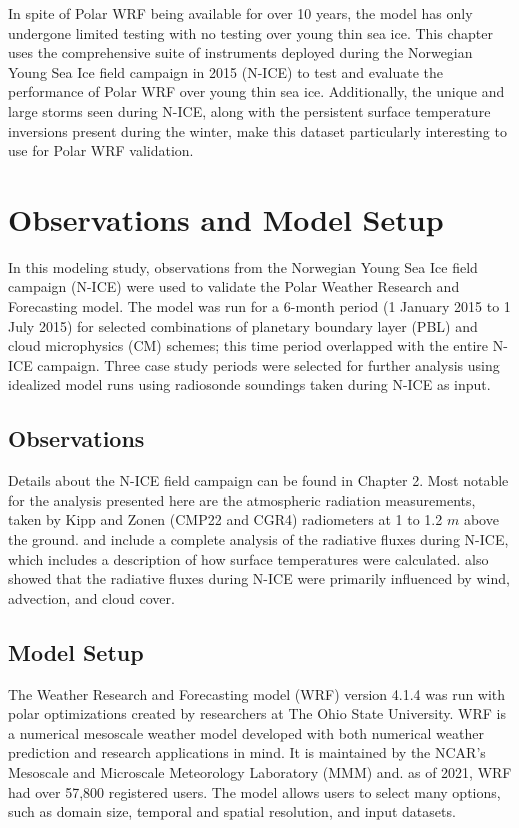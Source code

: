 In spite of Polar WRF being available for over 10 years, the model has only undergone limited testing with no testing over young thin sea ice. This chapter uses the comprehensive suite of instruments deployed during the Norwegian Young Sea Ice field campaign in 2015 (N-ICE) to test and evaluate the performance of Polar WRF over young thin sea ice. Additionally, the unique and large storms seen during N-ICE, along with the persistent surface temperature inversions present during the winter, make this dataset particularly interesting to use for Polar WRF validation.

\section{Observations and Model Setup}
In this modeling study, observations from the Norwegian Young Sea Ice field campaign (N-ICE) were used to validate the Polar Weather Research and Forecasting model. The model was run for a 6-month period (1 January 2015 to 1 July 2015) for selected combinations of planetary boundary layer (PBL) and cloud microphysics (CM) schemes; this time period overlapped with the entire N-ICE campaign. Three case study periods were selected for further analysis using idealized model runs using radiosonde soundings taken during N-ICE as input.

\subsection{Observations}
Details about the N-ICE field campaign can be found in Chapter 2. Most notable for the analysis presented here are the atmospheric radiation measurements, taken by Kipp and Zonen (CMP22 and CGR4) radiometers at 1 to 1.2 $m$ above the ground. \citet{granskog:2015} and \citet{walden:2017} include a complete analysis of the radiative fluxes during N-ICE, which includes a description of how surface temperatures were calculated. \citet{walden:2017} also showed that the radiative fluxes during N-ICE were primarily influenced by wind, advection, and cloud cover. 

\subsection{Model Setup}
The Weather Research and Forecasting model (WRF) version 4.1.4 was run with polar optimizations created by researchers at The Ohio State University. WRF is a numerical mesoscale weather model developed with both numerical weather prediction and research applications in mind. It is maintained by the NCAR's Mesoscale and Microscale Meteorology Laboratory (MMM) and. as of 2021, WRF had over 57,800 registered users. The model allows users to select many options, such as domain size, temporal and spatial resolution, and input datasets.

